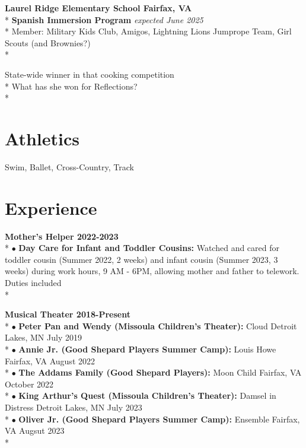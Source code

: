 \documentclass{article}
\begin{document}
\noindent \textbf{Laurel Ridge Elementary School \hfill Fairfax, VA} \\*
\textbf{Spanish Immersion Program} \hfill \textit{expected June 2025} \\*
\textendash Member: Military Kids Club, Amigos, Lightning Lions Jumprope Team, Girl Scouts (and Brownies?) \\*

\textendash State-wide winner in that cooking competition \\*
\textendash What has she won for Reflections? \\*


\section{Athletics}
\textendash Swim, Ballet, Cross-Country, Track




\section{Experience}
\noindent \textbf{Mother's Helper \hfill 2022-2023} \\*
$\bullet$ \textbf{Day Care for Infant and Toddler Cousins:} Watched and cared for toddler cousin (Summer 2022, 2 weeks) and infant cousin (Summer 2023, 3 weeks) during work hours, 9 AM - 6PM, allowing mother and father to telework. Duties included \\*

\noindent \textbf{Musical Theater \hfill 2018-Present} \\*
$\bullet$ \textbf{Peter Pan and Wendy (Missoula Children's Theater):} Cloud \hfill Detroit Lakes, MN \textendash  July 2019 \\*
$\bullet$ \textbf{Annie Jr. (Good Shepard Players Summer Camp):} Louis Howe \hfill Fairfax, VA \textendash  August 2022 \\*
$\bullet$ \textbf{The Addams Family (Good Shepard Players):} Moon Child \hfill Fairfax, VA \textendash  October 2022 \\*
$\bullet$ \textbf{King Arthur's Quest (Missoula Children's Theater):} Damsel in Distress \hfill Detroit Lakes, MN \textendash  July 2023 \\*
$\bullet$ \textbf{Oliver Jr. (Good Shepard Players Summer Camp):} Ensemble \hfill Fairfax, VA \textendash  Augsut 2023\\*
\end{document}

